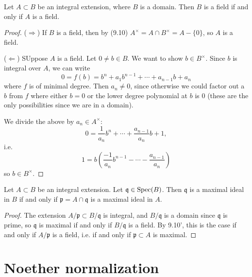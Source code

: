 \documentclass[12pt]{article}
\begin{document}
\begin{proposition}
	Let $A\subset B$ be an integral extension, where $B$ is a domain. Then $B$ is a field if and only if $A$ is a field.
\end{proposition}
\begin{proof}
	($\Rightarrow$) If $B$ is a field, then by (9.10) $A^\times = A\cap B^\times = A - \{0\}$, so $A$ is a field.

	($\Leftarrow$) SUppose $A$ is a field. Let $0\neq b\in B$. We want to show $b\in B^\times$. Since $b$ is integral over $A$, we can write 
	\begin{equation*}
		0 = f(b) = b^n + a_1b^{n-1} + \cdots + a_{n-1}b+a_n
	\end{equation*}
	where $f$ is of minimal degree. Then $a_n\neq 0$, since otherwise we could factor out a $b$ from $f$ where either $b=0$ or the lower degree polynomial at $b$ is 0 (these are the only possibilities since we are in a domain).

	We divide the above by $a_n\in A^\times$:
	\begin{equation*}
		0 = \frac{1}{a_n}b^n + \cdots + \frac{a_{n-1}}{a_n}b + 1,
	\end{equation*}
	i.e. 
	\begin{equation*}
		1 = b \left( \frac{-1}{a_n}b^{n-1} - \cdots - \frac{a_{n-1}}{a_n}\right)
	\end{equation*}
	so $b\in B^\times$.
\end{proof}

\begin{corollary}
\label{cor_integral_ext_maximal_upstairs_iff_maximal_downstairs}
	Let $A\subset B$ be an integral extension. Let $\mathfrak{q}\in\text{Spec}(B)$. Then $\mathfrak{q}$ is a maximal ideal in $B$ if and only if $\mathfrak{p}=A\cap\mathfrak{q}$ is a maximal ideal in $A$.
\end{corollary}
\begin{proof}
	The extension $A/\mathfrak{p} \subset B/\mathfrak{q}$ is integral, and $B/\mathfrak{q}$ is a domain since $\mathfrak{q}$ is prime, so $\mathfrak{q}$ is maximal if and only if $B/\mathfrak{q}$ is a field. By 9.10', this is the case if and only if $A/\mathfrak{p}$ is a field, i.e. if and only if $\mathfrak{p}\subset A$ is maximal.
\end{proof}


\section{Noether normalization} %
\end{document}
